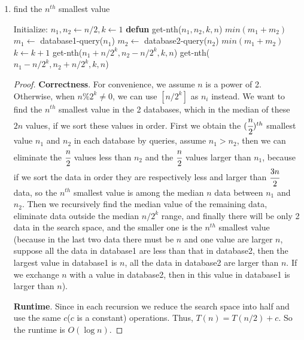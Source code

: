 \documentclass[paper=a4, fontsize=11pt]{scrartcl} %
\numberwithin{equation}{section} %
\numberwithin{figure}{section} %
\numberwithin{table}{section} %
\newenvironment{myproof}{\begin{proof}\setlength{\parindent}{2em}}{\end{proof}}
\begin{document}
\begin{enumerate}
\begin{myproof}
\textbf{Runtime}. This algorithm has the same runtime as Prim's algorithm, $O(m+n)$ ($m$ is the number of edges). The worst case scenario happens when every node in $G$ is connected to each other. In this case $T$ checks with every possible edge in each while loop excution, at that time $m=n^2$. 
\end{myproof}
\newpage
\item %
\begin{algorithm}
\caption{find the $n^{th}$ smallest value }
\begin{algorithmic}
\STATE Initialize: $n_1, n_2\leftarrow n/2, k\leftarrow 1$
\STATE \textbf{defun} get-nth($n_1, n_2, k, n$)
	\RETURN $min(m_1+m_2)$ 
\ENDIF
\STATE $m_1\leftarrow$ database1-query($n_1$)
\STATE $m_2\leftarrow$ database2-query($n_2$)
	\RETURN $min(m_1+m_2)$
\ENDIF
\STATE $k\leftarrow k+1$
	\STATE  get-nth($n_1+n/2^k, n_2-n/2^k, k, n$)
\ELSE
	\STATE get-nth($n_1-n/2^k, n_2+n/2^k, k, n$)
\ENDIF
\end{algorithmic}
\end{algorithm}
\begin{myproof}
\textbf{Correctness}. For convenience, we assume $n$ is a power of 2. Otherwise, when $n\%2^k \neq 0$, we can use $[n/2^k]$ as $n_i$ instead. We want to find the $n^{th}$ smallest value in the 2 databases, which in the median of these $2n$ values, if we sort these values in order. First we obtain the $(\cfrac{n}{2})^{th}$ smallest value $n_1$ and $n_2$ in each database by queries, assume $n_1>n_2$, then we can eliminate the $\cfrac{n}{2}$ values less than $n_2$ and the $\cfrac{n}{2}$ values larger than $n_1$, because if we sort the data in order they are respectively less and larger than $\cfrac{3n}{2}$ data, so the $n^{th}$ smallest value is among the median $n$ data between $n_1$ and $n_2$. Then we recursively find the median value of the remaining data, eliminate data outside the median $n/2^k$ range, and finally there will be only 2 data in the search space, and the smaller one is the $n^{th}$ smallest value (because in the last two data there must be $n$ and one value are larger $n$, suppose all the data in database1 are less than that in database2, then the largest value in database1 is $n$, all the data in database2 are larger than $n$. If we exchange $n$ with a value in database2, then in this value in database1 is larger than $n$).

\textbf{Runtime}. Since in each recursion we reduce the search space into half and use the same $c$($c$ is a constant) operations. Thus, $T(n) = T(n/2) + c$. So the runtime is $O(\log n)$. 
\end{myproof}
\end{enumerate}
\end{document}

